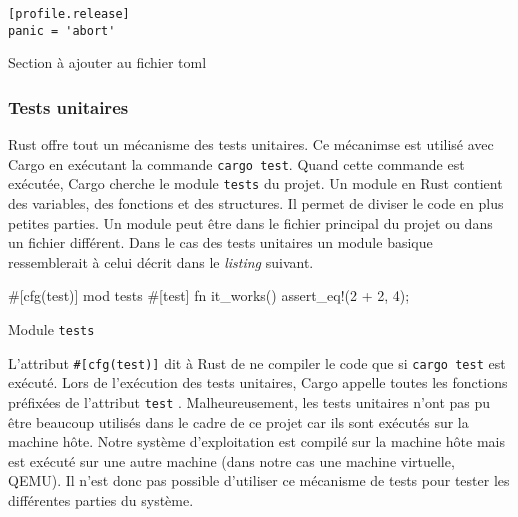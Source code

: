 \begin{code}
\begin{verbatim}
[profile.release]
panic = 'abort'
\end{verbatim}
\caption{Section à ajouter au fichier \acrshort{toml}}
\label{lst:rust:errors:abort}
\end{code} \bigbreak

\subsubsection{Tests unitaires}
Rust offre tout un mécanisme des tests unitaires. Ce mécanimse est utilisé avec
Cargo en exécutant la commande \texttt{cargo test}. Quand cette
commande est exécutée, Cargo cherche le module \texttt{tests} du projet.
Un module en Rust contient des variables, des fonctions et des structures. Il permet
de diviser le code en plus petites parties. Un module peut être dans le fichier
principal du projet ou dans un fichier différent. Dans le cas des tests unitaires
un module basique ressemblerait à celui décrit dans le \textit{listing} suivant.

\begin{code}
\begin{rustcode}
#[cfg(test)]
mod tests {
    #[test]
    fn it_works() {
        assert_eq!(2 + 2, 4);
    }
}
\end{rustcode}
\caption{Module \texttt{tests}}
\label{lst:rust:tests}
\end{code} \bigbreak

L'attribut \texttt{#[cfg(test)]} dit à Rust de ne compiler le code
que si \texttt{cargo test} est exécuté. Lors de l'exécution des tests
unitaires, Cargo appelle toutes les fonctions préfixées de l'attribut \texttt{test}
\cite{ref2}. Malheureusement, les tests unitaires n'ont pas pu être beaucoup utilisés
dans le cadre de ce projet car ils sont exécutés sur la machine hôte. Notre système
d'exploitation est compilé sur la machine hôte mais est exécuté sur une autre
machine (dans notre cas une machine virtuelle, QEMU). Il n'est donc pas possible
d'utiliser ce mécanisme de tests pour tester les différentes parties du système.


